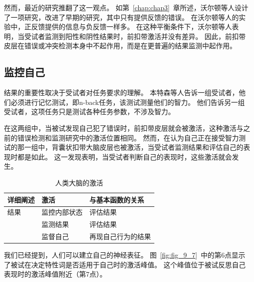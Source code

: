 然而，最近的研究推翻了这一观点。
如第~\ref{chap:chap3}~章所述，沃尔顿等人\cite{walton2004interactions}设计了一项研究，改进了早期的研究，其中只有提供反馈的错误。
在沃尔顿等人的实验中，正反馈提供的信息与负反馈一样多。
在这种平衡条件下，沃尔顿等人表明，当受试者监测到阳性和阴性结果时，前扣带激活并没有差异。
因此，前扣带皮层在错误或冲突检测本身中不起作用，而是在更普遍的结果监测中起作用。
\par



\subsection{监控自己}
\par
结果的重要性取决于受试者对任务要求的理解。
本特森等人\cite{bengtsson2009motivation}告诉一组受试者，他们必须进行记忆测试，即n-back任务，该测试测量他们的智力。
他们告诉另一组受试者，这项任务只是测试各种任务参数，不涉及智力。
\par


在这两组中，当被试发现自己犯了错误时，前扣带皮层就会被激活，这种激活与之前的错误检测和监测研究中的激活位置相同\cite{botvinick2004conflict}。
然而，在认为自己正在接受智力测试的那一组中，背囊状扣带大脑皮层也被激活，当受试者监测结果和评估自己的表现时都是如此。
这一发现表明，当受试者判断自己的表现时，这些激活就会发生。
\par


\begin{table}[htbp] 
	\newcommand{\tabincell}[2]{\begin{tabular}{@{}#1@{}}#2\end{tabular}} %
	\centering
	\caption{人类大脑的激活\label{tab:9_5}}
	\renewcommand\arraystretch{1.5}	%
	\begin{tabular}{lll}
		\toprule
		详细阐述 & 激活 & 与基本函数的关系\\
		\midrule
		结果 & 监控内部状态 & 评估结果  \\
		& 监测结果 & 评估结果 \\
		& 监督自己 & 再现自己行为的结果 \\
		\bottomrule
		
	\end{tabular}%
\end{table}%


我们已经提到，人们可以建立自己的神经表征。
图~\ref{fig:fig_9_7}~中的第6点显示了被试在决定特性词是否适用于自己时的激活峰值\cite{ochsner2005neural}。
这个峰值位于被试反思自己表现时的激活峰值附近（第7点）。
\par



